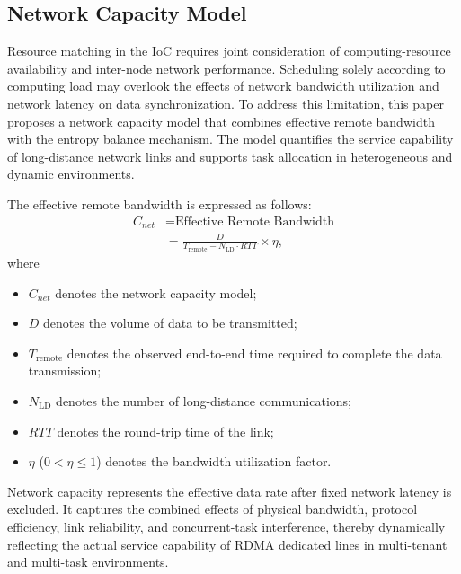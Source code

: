 \documentclass{ccjnl}
\begin{document}
\subsection{Network Capacity Model}
\label{s3-6}

Resource matching in the IoC requires joint consideration of computing-resource availability and inter-node network performance. Scheduling solely according to computing load may overlook the effects of network bandwidth utilization and network latency on data synchronization. To address this limitation, this paper proposes a network capacity model that combines effective remote bandwidth with the entropy balance mechanism. The model quantifies the service capability of long-distance network links and supports task allocation in heterogeneous and dynamic environments.

The effective remote bandwidth is expressed as follows:
\begin{equation}
	\begin{aligned}
		C_{net}
		&= \text{Effective Remote Bandwidth} \\
		&= \frac{D}
		{T_{\text{remote}}-N_{\text{LD}}\cdot RTT}
		\times{\eta},
	\end{aligned}
	\label{eq:effective_remote_bandwidth}
\end{equation}
where
\begin{itemize}[nosep]
	\item $C_{net}$ denotes the network capacity model;
	
	\item $D$ denotes the volume of data to be transmitted;
	
	\item $T_{\text{remote}}$ denotes the observed end-to-end time required to complete the data transmission;
	
	\item $N_{\text{LD}}$ denotes the number of long-distance communications;
	
	\item $RTT$ denotes the round-trip time of the link;
	
	\item $\eta$ ($0<\eta\leqslant1$) denotes the bandwidth utilization factor.
\end{itemize}

Network capacity represents the effective data rate after fixed network latency is excluded. It captures the combined effects of physical bandwidth, protocol efficiency, link reliability, and concurrent-task interference, thereby dynamically reflecting the actual service capability of RDMA dedicated lines in multi-tenant and multi-task environments.
\end{document}
